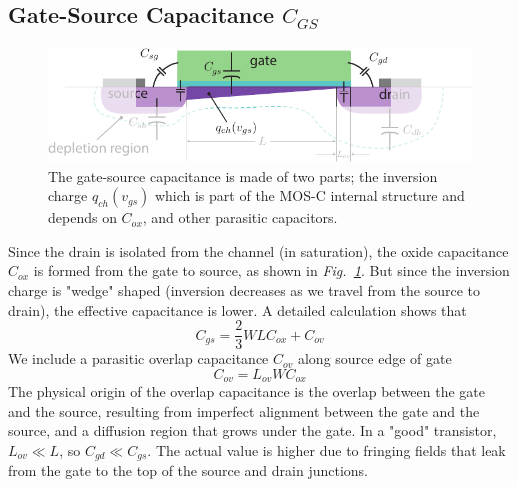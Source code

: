 \subsection{Gate-Source Capacitance \texorpdfstring{$C_{GS}$}{}}
\begin{figure}[tb]
\centering
\includegraphics[width=.75\columnwidth]{mos_caps_Cgs}
\caption{The gate-source capacitance is made of two parts; the inversion charge $q_{ch}(v_{gs})$ which is part of the MOS-C internal structure and depends on $C_{ox}$, and other parasitic capacitors.} \label{fig:mos_caps_Cgs}
\end{figure}
Since the drain is isolated from the channel (in saturation), the oxide capacitance $C_{ox}$ is formed from the gate to source, as shown in \emph{Fig.~\ref{fig:mos_caps_Cgs}}.  But since the inversion charge is "wedge" shaped (inversion decreases as we travel from the source to drain), the effective capacitance is lower.  A detailed calculation shows that
    \begin{equation}
        C_{gs} = \frac{2}{3} W L C_{ox} + C_{ov} 
    \end{equation} 
We include a parasitic overlap capacitance $C_{ov}$ along source edge of gate 
    \begin{equation}
        C_{ov} = L_{ov} W C_{ox}
    \end{equation}
The physical origin of the overlap capacitance is the overlap between the gate and the source, resulting from imperfect alignment between the gate and the source, and a diffusion region that grows under the gate.   In a "good" transistor, $L_{ov} \ll L$, so $C_{gd} \ll C_{gs}$.  The actual value is higher due to fringing fields that leak from the gate to the top of the source and drain junctions.
